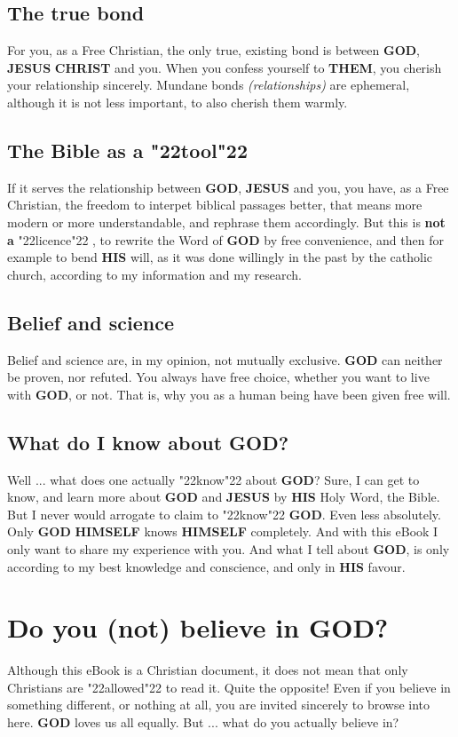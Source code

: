 \documentclass[10pt,a5paper]{article}
\newcommand{\Christ}[0]{\textbf{CHRIST}}
\newcommand{\God}[0]{\textbf{GOD}}
\newcommand{\Himself}[0]{\textbf{HIMSELF}}
\newcommand{\His}[0]{\textbf{HIS}}
\newcommand{\Jesus}[0]{\textbf{JESUS}}
\newcommand{\Them}[0]{\textbf{THEM}}
\newcommand{\q}[1]{\char"22{#1}\char"22 }
\begin{document}
	\subsection{The true bond}
		For you,
		as a Free Christian,
		the only true,
		existing bond is between {\God},
		{\Jesus} {\Christ} and you.
		When you confess yourself to {\Them},
		you cherish your relationship sincerely.
		Mundane bonds \textit{(relationships)} are ephemeral,
		although it is not less important,
		to also cherish them warmly.
			
	\subsection{The Bible as a \q{tool}}
		If it serves the relationship between {\God},
		{\Jesus} and you,
		you have,
		as a Free Christian,
		the freedom to interpet biblical passages better,
		that means more modern or more understandable,
		and rephrase them accordingly.
		But this is \textbf{not a} \q{licence},
		to rewrite the Word of {\God} by free convenience,
		and then for example to bend {\His} will,
		as it was done willingly in the past by the catholic church,
		according to my information and my research.
		
	\subsection{Belief and science}
		Belief and science are,
		in my opinion,
		not mutually exclusive.
		{\God} can neither be proven,
		nor refuted.
		You always have free choice,
		whether you want to live with {\God},
		or not.
		That is,
		why you as a human being have been given free will.

	\subsection{What do I know about {\God}?}
		Well ... what does one actually \q{know} about {\God}?
		Sure,
		I can get to know,
		and learn more about {\God} and {\Jesus} by {\His} Holy Word,
		the Bible.
		But I never would arrogate to claim to \q{know} {\God}.
		Even less absolutely.
		Only {\God} {\Himself} knows {\Himself} completely.
		And with this eBook I only want to share my experience with you.
		And what I tell about {\God},
		is only according to my best knowledge and conscience,
		and only in {\His} favour.
		
	\newpage
	\section{Do you (not) believe in {\God}?}
		Although this eBook is a Christian document,
		it does not mean that only Christians are \q{allowed} to read it.
		Quite the opposite!
		Even if you believe in something different,
		or nothing at all,
		you are invited sincerely to browse into here.
		{\God} loves us all equally.
		But ... what do you actually believe in?
\end{document}
